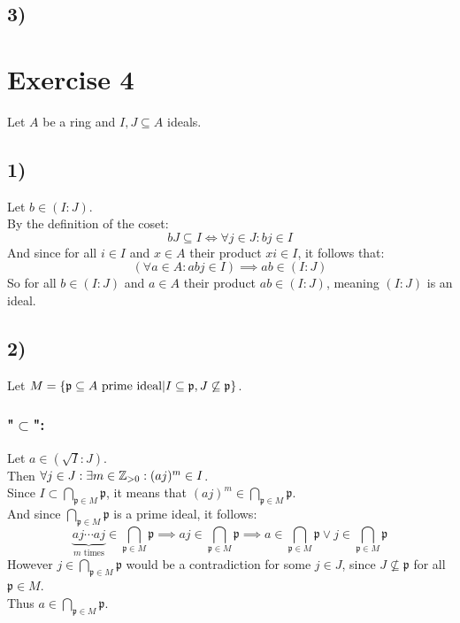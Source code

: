 \documentclass[a4paper]{scrartcl}
\begin{document}
\subsection*{3)}















\section*{Exercise 4}
Let $A$ be a ring and $I,J\subseteq A$ ideals.
\subsection*{1)}
Let $b\in (I:J)$.\\
By the definition of the coset:
\[bJ\subseteq I\Longleftrightarrow \forall j\in J:bj\in I\]
And since for all $i\in I$ and $x\in A$ their product $xi\in I$, it follows that:
\[(\forall a\in A:abj\in I)\implies ab\in (I:J)\]
So for all $b\in(I:J)$ and $a\in A$ their product $ab\in(I:J)$, meaning $(I:J)$ is an ideal.
\subsection*{2)}
Let $M=\left\lbrace \mathfrak{p}\subseteq A\text{ prime ideal}|I\subseteq\mathfrak{p},J\not\subseteq\mathfrak{p} \right\rbrace$.
\subsubsection*{"$\subset$":}
Let $a\in(\sqrt{I}:J)$.\\
Then $\forall j\in J:\exists m\in\mathbb{Z}_{>0}:(aj)^m\in I$.\\
Since $I\subset\underset{\mathfrak{p}\in M}{\bigcap}\mathfrak{p}$, it means that $(aj)^m\in\underset{\mathfrak{p}\in M}{\bigcap}\mathfrak{p}$.\\
And since $\underset{\mathfrak{p}\in M}{\bigcap}\mathfrak{p}$ is a prime ideal, it follows:
\[\underbrace{aj\cdots aj}_{m\text{ times}}\in\underset{\mathfrak{p}\in M}{\bigcap}\mathfrak{p}\implies aj\in\underset{\mathfrak{p}\in M}{\bigcap}\mathfrak{p}\implies a\in\underset{\mathfrak{p}\in M}{\bigcap}\mathfrak{p}\vee j\in \underset{\mathfrak{p}\in M}{\bigcap}\mathfrak{p}\]
However $j\in \underset{\mathfrak{p}\in M}{\bigcap}\mathfrak{p}$ would be a contradiction for some $j\in J$, since $J\not\subseteq\mathfrak{p}$ for all $\mathfrak{p}\in M$.\\
Thus $a\in\underset{\mathfrak{p}\in M}{\bigcap}\mathfrak{p}$.
\end{document}

